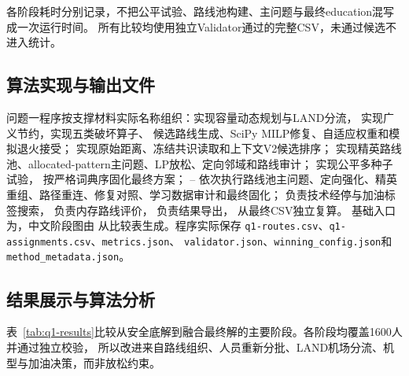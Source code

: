 \documentclass[UTF8,a4paper,zihao=5]{ctexart}
\begin{document}
各阶段耗时分别记录，不把公平试验、路线池构建、主问题与最终education混写成一次运行时间。
所有比较均使用独立Validator通过的完整CSV，未通过候选不进入统计。

\subsection{算法实现与输出文件}

问题一程序按支撑材料实际名称组织：实现容量动态规划与LAND分流，
实现广义节约，实现五类破坏算子、
候选路线生成、SciPy MILP修复、自适应权重和模拟退火接受；
实现原始距离、冻结共识读取和上下文V2候选排序；
实现精英路线池、allocated-pattern主问题、LP放松、定向邻域和路线审计；
实现公平多种子试验，
按严格词典序固化最终方案；
--
依次执行路线池主问题、定向强化、精英重组、路径重连、修复对照、学习数据审计和最终固化；
负责技术经停与加油标签搜索，
负责内存路线评价，
负责结果导出，
从最终CSV独立复算。
基础入口为，中文阶段图由
从比较表生成。程序实际保存
\texttt{q1-routes.csv}、\texttt{q1-assignments.csv}、\texttt{metrics.json}、
\texttt{validator.json}、\texttt{winning\_config.json}和\texttt{method\_metadata.json}。

\subsection{结果展示与算法分析}

表~\ref{tab:q1-results}比较从安全底解到融合最终解的主要阶段。各阶段均覆盖1600人并通过独立校验，
所以改进来自路线组织、人员重新分批、LAND机场分流、机型与加油决策，而非放松约束。
\end{document}

